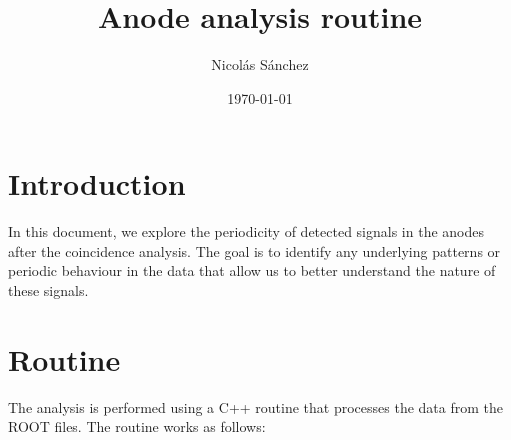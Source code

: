 \documentclass{article}
\title{Anode analysis routine}
\author{Nicolás Sánchez}
\date{\today}
\begin{document}
\maketitle

\section{Introduction}
In this document, we explore the periodicity of detected signals in the anodes after the coincidence analysis. The goal is to identify any underlying patterns or periodic behaviour in the data that allow us to better understand the nature of these signals.
\section{Routine}
The analysis is performed using a C++ routine that processes the data from the ROOT files. The routine works as follows:
\end{document}
